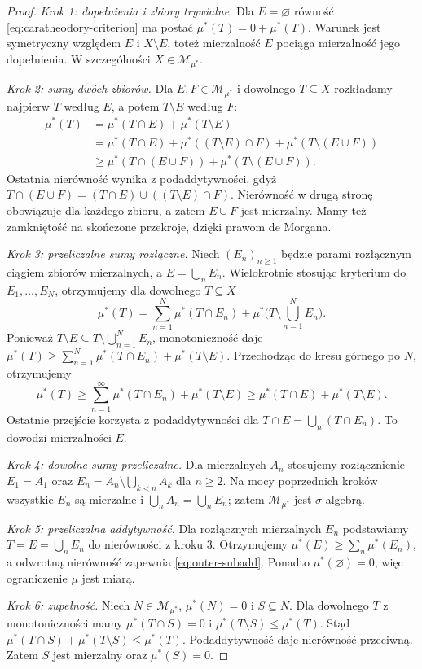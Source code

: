 \documentclass[11pt,a4paper,oneside]{book}
\numberwithin{equation}{chapter}
\theoremstyle{plain}
\theoremstyle{definition}
\theoremstyle{remark}
\begin{document}
\begin{proof}
\emph{Krok 1: dopełnienia i zbiory trywialne.}
Dla $E=\varnothing$ równość
\eqref{eq:caratheodory-criterion} ma postać
$\mu^*(T)=0+\mu^*(T)$. Warunek jest symetryczny względem
$E$ i $X\setminus E$, toteż mierzalność $E$ pociąga mierzalność
jego dopełnienia. W szczególności $X\in\mathcal M_{\mu^*}$.

\emph{Krok 2: sumy dwóch zbiorów.}
Dla $E,F\in\mathcal M_{\mu^*}$ i dowolnego $T\subseteq X$
rozkładamy najpierw $T$ według $E$, a potem $T\setminus E$
według $F$:
\begin{align*}
\mu^*(T)
&=\mu^*(T\cap E)+\mu^*(T\setminus E)\\
&=\mu^*(T\cap E)+\mu^*((T\setminus E)\cap F)
  +\mu^*(T\setminus(E\cup F))\\
&\ge\mu^*(T\cap(E\cup F))
  +\mu^*(T\setminus(E\cup F)).
\end{align*}
Ostatnia nierówność wynika z podaddytywności, gdyż
$T\cap(E\cup F)=(T\cap E)\cup((T\setminus E)\cap F)$.
Nierówność w drugą stronę obowiązuje dla każdego zbioru, a zatem
$E\cup F$ jest mierzalny. Mamy też zamkniętość na skończone
przekroje, dzięki prawom de Morgana.

\emph{Krok 3: przeliczalne sumy rozłączne.}
Niech $(E_n)_{n\ge1}$ będzie parami rozłącznym ciągiem
zbiorów mierzalnych, a $E=\bigcup_nE_n$.
Wielokrotnie stosując kryterium do $E_1,\ldots,E_N$,
otrzymujemy dla dowolnego $T\subseteq X$
\[
\mu^*(T)=\sum_{n=1}^N\mu^*(T\cap E_n)
+\mu^*\Big(T\setminus\bigcup_{n=1}^N E_n\Big).
\]
Ponieważ $T\setminus E\subseteq T\setminus\bigcup_{n=1}^N E_n$,
monotoniczność daje
$\mu^*(T)\ge\sum_{n=1}^N\mu^*(T\cap E_n)
+\mu^*(T\setminus E)$.
Przechodząc do kresu górnego po $N$, otrzymujemy
\[
\mu^*(T)\ge\sum_{n=1}^\infty\mu^*(T\cap E_n)
+\mu^*(T\setminus E)
\ge\mu^*(T\cap E)+\mu^*(T\setminus E).
\]
Ostatnie przejście korzysta z podaddytywności dla
$T\cap E=\bigcup_n(T\cap E_n)$. To dowodzi mierzalności $E$.

\emph{Krok 4: dowolne sumy przeliczalne.}
Dla mierzalnych $A_n$ stosujemy rozłącznienie
$E_1=A_1$ oraz $E_n=A_n\setminus\bigcup_{k<n}A_k$ dla $n\ge2$.
Na mocy poprzednich kroków wszystkie $E_n$ są mierzalne i
$\bigcup_n A_n=\bigcup_n E_n$; zatem
$\mathcal M_{\mu^*}$ jest $\sigma$-algebrą.

\emph{Krok 5: przeliczalna addytywność.}
Dla rozłącznych mierzalnych $E_n$ podstawiamy $T=E=\bigcup_nE_n$
do nierówności z kroku 3. Otrzymujemy
$\mu^*(E)\ge\sum_n\mu^*(E_n)$, a odwrotną nierówność zapewnia
\eqref{eq:outer-subadd}. Ponadto $\mu^*(\varnothing)=0$,
więc ograniczenie $\mu$ jest miarą.

\emph{Krok 6: zupełność.}
Niech $N\in\mathcal M_{\mu^*}$, $\mu^*(N)=0$ i $S\subseteq N$.
Dla dowolnego $T$ z monotoniczności mamy
$\mu^*(T\cap S)=0$ i
$\mu^*(T\setminus S)\le\mu^*(T)$.
Stąd
$\mu^*(T\cap S)+\mu^*(T\setminus S)\le\mu^*(T)$.
Podaddytywność daje nierówność przeciwną. Zatem $S$ jest
mierzalny oraz $\mu^*(S)=0$.
\end{proof}
\end{document}
